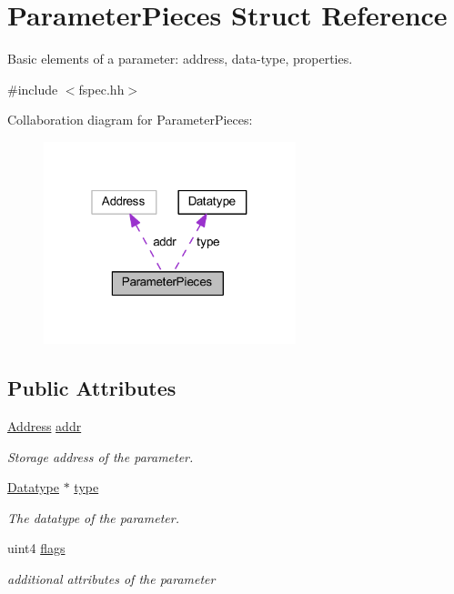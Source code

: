 \hypertarget{struct_parameter_pieces}{}\section{Parameter\+Pieces Struct Reference}
\label{struct_parameter_pieces}


Basic elements of a parameter\+: address, data-\/type, properties.  




{\ttfamily \#include $<$fspec.\+hh$>$}



Collaboration diagram for Parameter\+Pieces\+:
\nopagebreak
\begin{figure}[H]
\begin{center}
\leavevmode
\includegraphics[width=208pt]{struct_parameter_pieces__coll__graph}
\end{center}
\end{figure}
\subsection*{Public Attributes}
\begin{DoxyCompactItemize}
\item 
\mbox{\hyperlink{class_address}{Address}} \mbox{\hyperlink{struct_parameter_pieces_a64a8ea85886ffa493a625e75cb5b01e0}{addr}}
\begin{DoxyCompactList}\small\item\em Storage address of the parameter. \end{DoxyCompactList}\item 
\mbox{\hyperlink{class_datatype}{Datatype}} $\ast$ \mbox{\hyperlink{struct_parameter_pieces_a628fd8428a2331db63516291840e8409}{type}}
\begin{DoxyCompactList}\small\item\em The datatype of the parameter. \end{DoxyCompactList}\item 
uint4 \mbox{\hyperlink{struct_parameter_pieces_aedb19159c26f9137c4ec68238f25933a}{flags}}
\begin{DoxyCompactList}\small\item\em additional attributes of the parameter \end{DoxyCompactList}\end{DoxyCompactItemize}


